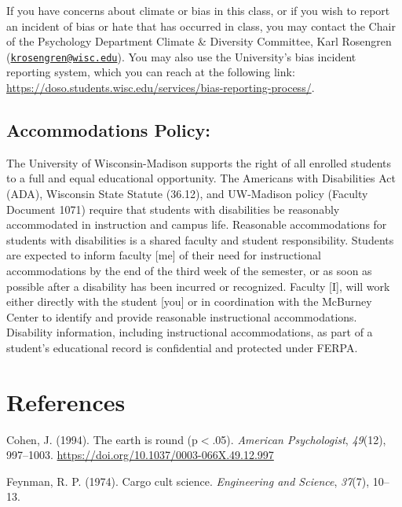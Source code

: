 \documentclass[11pt,man]{article}
\begin{document}
If you have concerns about climate or bias in this class, or if you wish
to report an incident of bias or hate that has occurred in class, you
may contact the Chair of the Psychology Department Climate \& Diversity
Committee, Karl Rosengren
(\href{mailto:krosengren@wisc.edu}{\nolinkurl{krosengren@wisc.edu}}).
You may also use the University's bias incident reporting system, which
you can reach at the following link:
\url{https://doso.students.wisc.edu/services/bias-reporting-process/}.

\subsection{Accommodations Policy:}\label{accommodations-policy}

The University of Wisconsin-Madison supports the right of all enrolled
students to a full and equal educational opportunity. The Americans with
Disabilities Act (ADA), Wisconsin State Statute (36.12), and UW-Madison
policy (Faculty Document 1071) require that students with disabilities
be reasonably accommodated in instruction and campus life. Reasonable
accommodations for students with disabilities is a shared faculty and
student responsibility. Students are expected to inform faculty {[}me{]}
of their need for instructional accommodations by the end of the third
week of the semester, or as soon as possible after a disability has been
incurred or recognized. Faculty {[}I{]}, will work either directly with
the student {[}you{]} or in coordination with the McBurney Center to
identify and provide reasonable instructional accommodations. Disability
information, including instructional accommodations, as part of a
student's educational record is confidential and protected under FERPA.

\newpage

\section*{References}\label{references}

\hypertarget{refs}{}
\hypertarget{ref-cohen_earth_1994}{}
Cohen, J. (1994). The earth is round (p\(<\).05). \emph{American
Psychologist}, \emph{49}(12), 997--1003.
\url{https://doi.org/10.1037/0003-066X.49.12.997}

\hypertarget{ref-feynman_cargo_1974-1}{}
Feynman, R. P. (1974). Cargo cult science. \emph{Engineering and
Science}, \emph{37}(7), 10--13.
\end{document}
